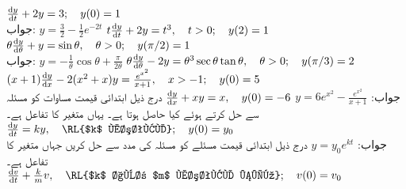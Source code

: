 $\frac{\dif y}{\dif t}+2y=3;\quad y(0)=1$\\
جواب:\quad
$y=\tfrac{3}{2}-\tfrac{1}{2}e^{-2t}$
$t\frac{\dif y}{\dif t}+2y=t^3,\quad t>0;\quad  y(2)=1$
$\theta\frac{\dif y}{\dif \theta}+y=\sin\theta,\quad \theta>0;\quad y(\pi/2)=1$\\
جواب:\quad
$y=-\tfrac{1}{\theta}\cos\theta+\tfrac{\pi}{2\theta}$
$\theta\frac{\dif y}{\dif \theta}-2y=\theta^3\sec\theta\tan\theta,\quad \theta>0;\quad y(\pi/3)=2$
$(x+1)\frac{\dif y}{\dif x}-2(x^2+x)y=\frac{e^{x^2}}{x+1},\quad x>-1;\quad y(0)=5$\\
جواب:\quad
$y=6e^{x^2}-\tfrac{e^{x^2}}{x+1}$
$\frac{\dif y}{\dif x}+xy=x,\quad y(0)=-6$
درج ذیل ابتدائی قیمت مساوات کو مسئلہ  سے حل کرتے ہوئے کیا حاصل ہوتا ہے۔ یہاں  متغیر  کا تفاعل ہے۔\\
$\frac{\dif y}{\dif t}=ky,\quad \text{\RL{$k$ مستقل}};\quad y(0)=y_0$\\
جواب:\quad
$y=y_0e^{kt}$
درج ذیل ابتدائی قیمت مسئلے کو مسئلہ  کی مدد سے حل کریں جہاں  متغیر  کا تفاعل ہے۔\\
$\frac{\dif v}{\dif t}+\frac{k}{m}v,\quad\text{\RL{$k$ اور $m$ مستقل ہیں}};\quad v(0)=v_0$

